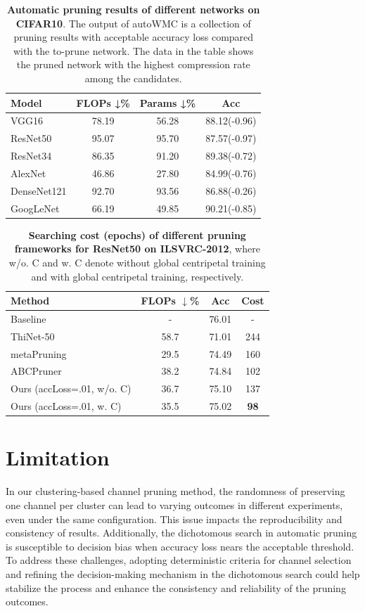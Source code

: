 \documentclass[sigconf, 10pt]{acmart}
\begin{document}
\begin{table}[]
\centering
\begin{tabular}{lccc}
\hline
Model & FLOPs ↓\% & Params ↓\% & Acc \\ \hline
VGG16 & 78.19 & 56.28 & 88.12(-0.96) \\
ResNet50 & 95.07 & 95.70 & 87.57(-0.97) \\
ResNet34 & 86.35 & 91.20 & 89.38(-0.72) \\
AlexNet & 46.86 & 27.80 & 84.99(-0.76) \\
DenseNet121 & 92.70 & 93.56 & 86.88(-0.26) \\
GoogLeNet & 66.19 & 49.85 & 90.21(-0.85) \\ \hline
\end{tabular}
\caption{\textbf{Automatic pruning results of different networks on CIFAR10}. The output of autoWMC is a collection of pruning results with acceptable accuracy loss compared with the to-prune network. The data in the table shows the pruned network with the highest compression rate among the candidates.}
\label{tab1}
\end{table}

\begin{table}[]
\centering
\begin{tabular}{lccc}
\hline
Method & FLOPs $\downarrow$\% & Acc & Cost \\ \hline
Baseline & - & 76.01 & - \\
ThiNet-50\cite{21} & 58.7 & 71.01 & 244 \\
metaPruning\cite{liu2019metapruning} & 29.5 & 74.49 & 160 \\
ABCPruner\cite{lin2021channel} & 38.2 & 74.84 & 102 \\
Ours (accLoss=.01, w/o. C) & 36.7 & 75.10 & 137 \\
Ours (accLoss=.01, w. C) & 35.5 & 75.02 & \textbf{98} \\ \hline
\end{tabular}
\caption{\textbf{Searching cost (epochs) of different pruning frameworks for ResNet50 on ILSVRC-2012}, where w/o. C and w. C denote without global centripetal training and with global centripetal training, respectively.}
\label{tab2}
\end{table}


\section{Limitation}

In our clustering-based channel pruning method, the randomness of preserving one channel per cluster can lead to varying outcomes in different experiments, even under the same configuration. This issue impacts the reproducibility and consistency of results. Additionally, the dichotomous search in automatic pruning is susceptible to decision bias when accuracy loss nears the acceptable threshold. To address these challenges, adopting deterministic criteria for channel selection and refining the decision-making mechanism in the dichotomous search could help stabilize the process and enhance the consistency and reliability of the pruning outcomes.
\end{document}
